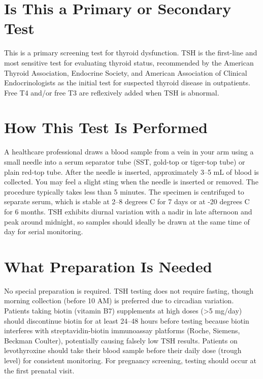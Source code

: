 \section*{Is This a Primary or Secondary Test}
This is a primary screening test for thyroid dysfunction. TSH is the first-line and most sensitive test for evaluating thyroid status, recommended by the American Thyroid Association, Endocrine Society, and American Association of Clinical Endocrinologists as the initial test for suspected thyroid disease in outpatients. Free T4 and/or free T3 are reflexively added when TSH is abnormal.

\section*{How This Test Is Performed}
A healthcare professional draws a blood sample from a vein in your arm using a small needle into a serum separator tube (SST, gold-top or tiger-top tube) or plain red-top tube. After the needle is inserted, approximately 3--5 mL of blood is collected. You may feel a slight sting when the needle is inserted or removed. The procedure typically takes less than 5 minutes. The specimen is centrifuged to separate serum, which is stable at 2--8 degrees C for 7 days or at -20 degrees C for 6 months. TSH exhibits diurnal variation with a nadir in late afternoon and peak around midnight, so samples should ideally be drawn at the same time of day for serial monitoring.

\section*{What Preparation Is Needed}
No special preparation is required. TSH testing does not require fasting, though morning collection (before 10 AM) is preferred due to circadian variation. Patients taking biotin (vitamin B7) supplements at high doses (>5 mg/day) should discontinue biotin for at least 24--48 hours before testing because biotin interferes with streptavidin-biotin immunoassay platforms (Roche, Siemens, Beckman Coulter), potentially causing falsely low TSH results. Patients on levothyroxine should take their blood sample before their daily dose (trough level) for consistent monitoring. For pregnancy screening, testing should occur at the first prenatal visit.

